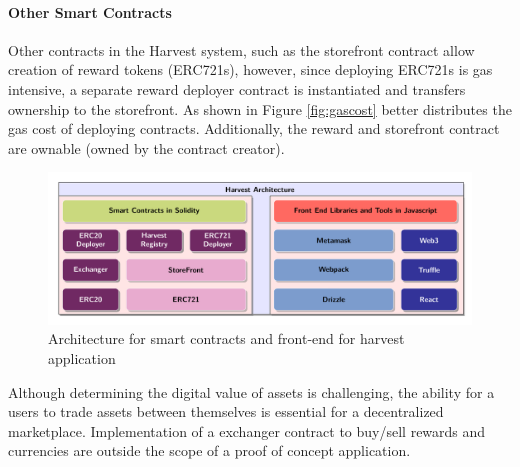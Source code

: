 \documentclass[12pt,tightenlines,letterpaper]{scrartcl}
\begin{document}
\paragraph{Other Smart Contracts}
Other contracts in the Harvest system, such as the storefront contract allow creation of reward tokens (ERC721s), however, since deploying ERC721s is gas intensive, a separate reward deployer contract is instantiated and transfers ownership to the storefront. As shown in Figure \ref*{fig:gascost} better distributes the gas cost of deploying contracts. Additionally, the reward and storefront contract are ownable (owned by the contract creator).

\begin{figure}[H]
\centering
\includegraphics[width=1\linewidth]{Images/harvestArchitecture}
\caption{Architecture for smart contracts and front-end for harvest application}
\label{fig:harvestarchitecture}
\end{figure}

 Although determining the digital value of assets is challenging, the ability for a users to trade assets between themselves is essential for a decentralized marketplace. Implementation of a exchanger contract to buy/sell rewards and currencies are outside the scope of a proof of concept application.

\end{document}
